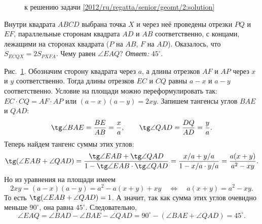 \ifsolution
\begin{figure}\centering
    \caption{к решению задачи \ref{2012/ru/regatta/senior/geomt/2:solution}}
    \label{2012/ru/regatta/senior/geomt/2:solution:fig}
\end{figure}%
\fi %

\problem
Внутри квадрата $ABCD$ выбрана точка $X$ и через неё проведены отрезки
$PQ$ и $EF$, параллельные сторонам квадрата $AD$ и $AB$ соответственно,
с концами, лежащими на сторонах квадрата ($P$ на $AB$, $F$ на $AD$).
Оказалось, что $S_{ECQX} = 2 S_{PXFA}$.
Чему равен $\angle EAQ$?
\solution
\label{2012/ru/regatta/senior/geomt/2:solution}%
\emph{Ответ:} $45^\circ$.
\par
Рис.~\ref{2012/ru/regatta/senior/geomt/2:solution:fig}.
Обозначим сторону квадрата через $a$, а длины отрезков $AF$ и $AP$ через
$x$ и $y$ соответственно.
Тогда длины отрезков $EC$ и $CQ$ равны $a - x$ и $a - y$ соответственно.
Условие на площади можно переформулировать так:
$EC \cdot CQ = AF \cdot AP$ или $(a - x) (a - y) = 2 x y$.
Запишем тангенсы углов $BAE$ и $QAD$:
\[
    \tg \angle BAE = \dfrac{BE}{AB} = \dfrac{x}{a}
,\qquad
    \tg \angle QAD = \dfrac{DQ}{AD} = \dfrac{y}{a}
.\]
Теперь найдем тангенс суммы этих углов:
\[
    \tg (\angle EAB + \angle QAD)
=
    \dfrac{
        \tg \angle EAB + \tg \angle QAD
    }{
        1 - \tg \angle EAB \cdot \tg \angle QAD
    }
=
    \dfrac{x / a + y / a}{1 - x / a \cdot y / a}
=
    \dfrac{a(x + y)}{a^2 - xy}
.\]
Но из уравнения на площади имеем
\[
    2 x y = (a - x) (a - y) = a^2 - a(x + y) + xy
\quad\Leftrightarrow\quad
    a (x + y) = a^2 - x y
.\]
То есть $\tg (\angle EAB + \angle QAD) = 1$.
А значит, так как сумма этих углов очевидно меньше $90^\circ$,
она равна $45^\circ$.
Следовательно,
\[
    \angle EAQ = \angle BAD - \angle BAE - \angle QAD
=
    90^\circ - (\angle BAE + \angle QAD) = 45^\circ
.\]
\endproblem
